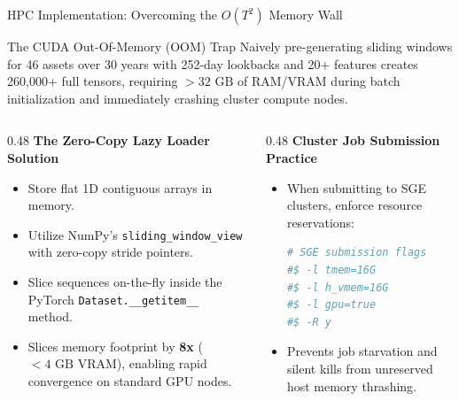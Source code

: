 \documentclass[10pt]{beamer}
\begin{document}
\begin{frame}[fragile]{HPC Implementation: Overcoming the $O(T^2)$ Memory Wall}
  \begin{alertblock}{The CUDA Out-Of-Memory (OOM) Trap}
    Naively pre-generating sliding windows for 46 assets over 30 years with 252-day lookbacks and 20+ features creates 260,000+ full tensors, requiring $>32\text{ GB}$ of RAM/VRAM during batch initialization and immediately crashing cluster compute nodes.
  \end{alertblock}
  \begin{columns}[t]
    \begin{column}{0.48\textwidth}
      \textbf{\scriptsize The Zero-Copy Lazy Loader Solution}
      \begin{itemize}\scriptsize
        \item Store flat 1D contiguous arrays in memory.
        \item Utilize NumPy's \texttt{sliding\_window\_view} with zero-copy stride pointers.
        \item Slice sequences on-the-fly inside the PyTorch \texttt{Dataset.\_\_getitem\_\_} method.
        \item Slices memory footprint by \textbf{8x} ($<4\text{ GB}$ VRAM), enabling rapid convergence on standard GPU nodes.
      \end{itemize}
    \end{column}
    \begin{column}{0.48\textwidth}
      \textbf{\scriptsize Cluster Job Submission Practice}
      \begin{itemize}\scriptsize
        \item When submitting to SGE clusters, enforce resource reservations:
        \begin{lstlisting}[language=bash]
# SGE submission flags
#$ -l tmem=16G
#$ -l h_vmem=16G
#$ -l gpu=true
#$ -R y
        \end{lstlisting}
        \item Prevents job starvation and silent kills from unreserved host memory thrashing.
      \end{itemize}
    \end{column}
  \end{columns}
\end{frame}
\end{document}
